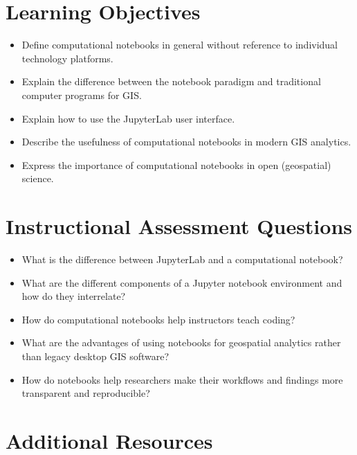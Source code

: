 \documentclass[11pt,letterpaper]{article}
\begin{document}
\setlength{\bibsep}{0.00cm plus 0.05cm}



\section*{Learning Objectives}

\begin{itemize}
    \item Define computational notebooks in general without reference to individual technology platforms.
    \item Explain the difference between the notebook paradigm and traditional computer programs for GIS.
    \item Explain how to use the JupyterLab user interface.
    \item Describe the usefulness of computational notebooks in modern GIS analytics.
    \item Express the importance of computational notebooks in open (geospatial) science.
\end{itemize}

\section*{Instructional Assessment Questions}

\begin{itemize}
    \item What is the difference between JupyterLab and a computational notebook?
    \item What are the different components of a Jupyter notebook environment and how do they interrelate?
    \item How do computational notebooks help instructors teach coding?
    \item What are the advantages of using notebooks for geospatial analytics rather than legacy desktop GIS software?
    \item How do notebooks help researchers make their workflows and findings more transparent and reproducible?
\end{itemize}

\section*{Additional Resources}
\end{document}
